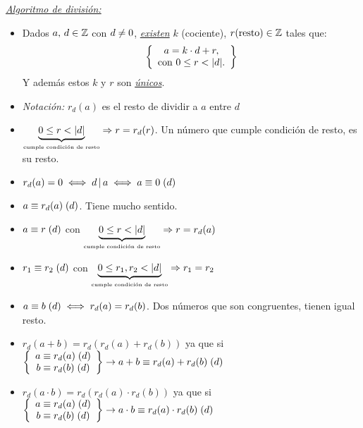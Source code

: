 \textit{\underline{Algoritmo de división:}}\\
\newcommand{\condicionResto}[1]{\ub{0 \leq #1 < |d|}{\text{\tiny cumple condición de resto}}}
\begin{itemize}
	\item
	      Dados $a, \, d \en \enteros$ con $d \distinto 0$,
	      \textit{\underline{existen}} $k$ (cociente),
	      $r \text{(resto)} \en \enteros$ tales que:\\
	      \[
		      \llaves{c}{
			      a =  k \cdot d + r,\\
			      \text{con } 0\leq r < |d|.
		      }
	      \]
	      Y además estos $k$ y $r$ son \textit{\underline{únicos}}.\\

	\item \textit{Notación: } $r_d(a)$ es el resto de dividir a $a$ entre $d$

	\item $\condicionResto{r} \entonces r = r_d(r)$. Un número que cumple condición de resto, es su resto.

	\item $r_d(a) = 0 \sisolosi d \divideA a \sisolosi \congruencia{a}{0}{d}$

	\item $\congruencia{a}{r_d(a)}{d}$. Tiene mucho sentido.

	\item $\congruencia{a}{r}{d}$ con $\condicionResto{r} \entonces r = r_d(a)$

	\item $\congruencia{r_1}{r_2}{d}$ con $\condicionResto{r_1,r_2} \entonces r_1 = r_2$

	\item $\congruencia{a}{b}{d} \sisolosi r_d(a) = r_d(b)$. Dos números que son congruentes, tienen igual resto.

	\item $r_d(a+b) = r_d(r_d(a) + r_d(b))$ ya que si
	      $ \llaves{c}{
			      \congruencia{a}{r_d(a)}{d}\\
			      \congruencia{b}{r_d(b)}{d}
		      } \to \congruencia{a + b}{r_d(a) + r_d(b)}{d}
	      $

	\item $r_d(a \cdot b) = r_d(r_d(a) \cdot r_d(b))$ ya que si
	      $ \llaves{c}{
			      \congruencia{a}{r_d(a)}{d}\\
			      \congruencia{b}{r_d(b)}{d}
		      } \to \congruencia{a \cdot b}{r_d(a) \cdot r_d(b)}{d}$
\end{itemize}

